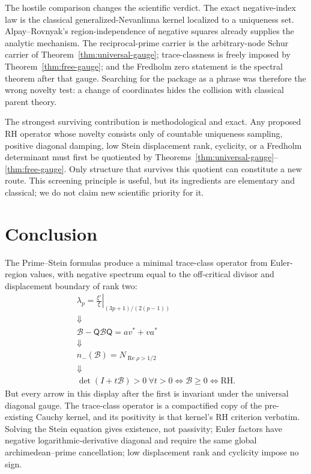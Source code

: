 \documentclass[11pt]{article}
\theoremstyle{definition}
\theoremstyle{remark}
\newcommand{\cB}{\mathcal B}
\newcommand{\nm}{n_{-}}
\newcommand{\Rea}{\operatorname{Re}}
\begin{document}
The hostile comparison changes the scientific verdict.  The exact negative-index law is the
classical generalized-Nevanlinna kernel localized to a uniqueness set.  Alpay--Rovnyak's
region-independence of negative squares already supplies the analytic mechanism.  The
reciprocal-prime carrier is the arbitrary-node Schur carrier of
Theorem~\ref{thm:universal-gauge}; trace-classness is freely imposed by
Theorem~\ref{thm:free-gauge}; and the Fredholm zero statement is the spectral theorem after that
gauge.  Searching for the package as a phrase was therefore the wrong novelty test: a change of
coordinates hides the collision with classical parent theory.

The strongest surviving contribution is methodological and exact.  Any proposed RH operator
whose novelty consists only of countable uniqueness sampling, positive diagonal damping,
low Stein displacement rank, cyclicity, or a Fredholm determinant must first be quotiented by
Theorems~\ref{thm:universal-gauge}--\ref{thm:free-gauge}.  Only structure that survives this
quotient can constitute a new route.  This screening principle is useful, but its ingredients are
elementary and classical; we do not claim new scientific priority for it.

\section{Conclusion}

The Prime--Stein formulas produce a minimal trace-class operator from Euler-region values, with
negative spectrum equal to the off-critical divisor and displacement boundary of rank two:
\[
 \boxed{
 \begin{array}{c}
 \displaystyle
 \lambda_p=
 \left.\frac{\xi'}{\xi}\right|_{(3p+1)/(2(p-1))}
 \\[2mm]
 \Downarrow\\[-1mm]
 \cB-\mathsf Q\cB\mathsf Q=av^*+va^*
 \\[1mm]
 \Downarrow\\[-1mm]
 \nm(\cB)=N_{\Rea\rho>1/2}
 \\[1mm]
 \Downarrow\\[-1mm]
 \det(I+t\cB)>0\ \forall t>0
 \Longleftrightarrow\cB\geq0
 \Longleftrightarrow\mathrm{RH}.
 \end{array}}
\]
But every arrow in this display after the first is invariant under the universal diagonal gauge.
The trace-class operator is a compactified copy of the pre-existing Cauchy kernel, and its
positivity is that kernel's RH criterion verbatim.  Solving the Stein equation gives existence,
not passivity; Euler factors have negative logarithmic-derivative diagonal and require the same
global archimedean--prime cancellation; low displacement rank and cyclicity impose no sign.
\end{document}
